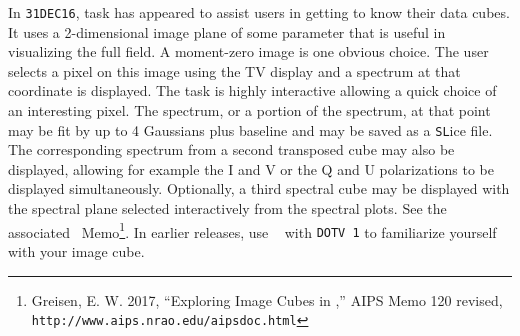 
     In {\tt 31DEC16}, task {\tt {}} has appeared to assist
users in getting to know their data cubes.  It uses a 2-dimensional
image plane of some parameter that is useful in visualizing the full
field.  A moment-zero image is one obvious choice.  The user selects a
pixel on this image using the TV display and a spectrum at that
coordinate is displayed.  The task is highly interactive allowing a
quick choice of an interesting pixel.  The spectrum, or a portion of
the spectrum, at that point may be fit by up to 4 Gaussians plus
baseline and may be saved as a {\tt SL}ice file.  The corresponding
spectrum from a second transposed cube may also be displayed, allowing
for example the I and V or the Q and U polarizations to be displayed
simultaneously.  Optionally, a third spectral cube may be displayed
with the spectral plane selected interactively from the spectral
plots.  See the associated \AIPS\ Memo\footnote{Greisen, E. W. 2017,
``Exploring Image Cubes in \AIPS,'' AIPS Memo 120 revised,  {\tt
http://www.aips.nrao.edu/aipsdoc.html}}.  In earlier releases, use {\tt
{}} with {\tt DOTV 1} to familiarize yourself with your
image cube.

